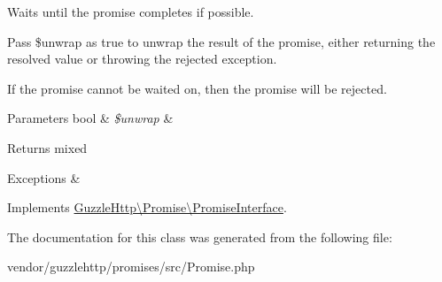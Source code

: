 Waits until the promise completes if possible.

Pass \$unwrap as true to unwrap the result of the promise, either returning the resolved value or throwing the rejected exception.

If the promise cannot be waited on, then the promise will be rejected.


\begin{DoxyParams}[1]{Parameters}
bool & {\em \$unwrap} & \\
\hline
\end{DoxyParams}
\begin{DoxyReturn}{Returns}
mixed 
\end{DoxyReturn}

\begin{DoxyExceptions}{Exceptions}
{\em } & \\
\hline
\end{DoxyExceptions}


Implements \hyperlink{interfaceGuzzleHttp_1_1Promise_1_1PromiseInterface_ad7f8dc7f9513af40c61a985ad89b6219}{Guzzle\+Http\textbackslash{}\+Promise\textbackslash{}\+Promise\+Interface}.



The documentation for this class was generated from the following file\+:\begin{DoxyCompactItemize}
\item 
vendor/guzzlehttp/promises/src/Promise.\+php\end{DoxyCompactItemize}
